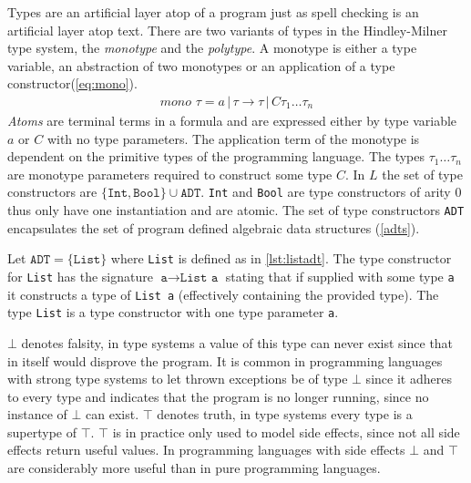 \documentclass[11pt,oneside,a4paper]{report}
\begin{document}
Types are an artificial layer atop of a program just as spell checking is an artificial layer atop text.
There are two variants of types in the Hindley-Milner type system, the \textit{monotype} and the \textit{polytype}.
A monotype is either a type variable, an abstraction of two monotypes or an application of a type constructor(\autoref{eq:mono}).
\begin{align}
	mono \,\,\tau = a \,|\, \tau \rightarrow \tau \,|\, C \tau_1 \dots \tau_n
	\label{eq:mono}
\end{align}
\textit{Atoms} are terminal terms in a formula and are expressed either by type variable $a$ or $C$ with no type parameters.
The application term of the monotype is dependent on the primitive types of the programming language.
The types $\tau_1 \dots \tau_n$ are monotype parameters required to construct some type $C$.
In $L$ the set of type constructors are $\{ \texttt{Int}, \texttt{Bool} \} \cup \texttt{ADT}$.
\texttt{Int} and \texttt{Bool} are type constructors of arity 0 thus only have one instantiation and are atomic.
The set of type constructors \texttt{ADT} encapsulates the set of program defined algebraic data structures (\autoref{adts}).
\begin{exmp}
    Let $\texttt{ADT} = \{ \texttt{List} \}$ where \texttt{List} is defined as in \autoref{lst:listadt}.
    The type constructor for \texttt{List} has the signature $\texttt{a} \rightarrow \texttt{List a}$ stating that if supplied with some type \texttt{a} it constructs a type of \texttt{List a} (effectively containing the provided type).
    The type \texttt{List} is a type constructor with one type parameter \texttt{a}.
\end{exmp}

$\bot$ denotes falsity, in type systems a value of this type can never exist since that in itself would disprove the program.
It is common in programming languages with strong type systems to let thrown exceptions be of type $\bot$ since it adheres to every type and indicates that the program is no longer running, since no instance of $\bot$ can exist.
$\top$ denotes truth, in type systems every type is a supertype of $\top$.
$\top$ is in practice only used to model side effects, since not all side effects return useful values.
In programming languages with side effects $\bot$ and $\top$ are considerably more useful than in pure programming languages.
\end{document}
